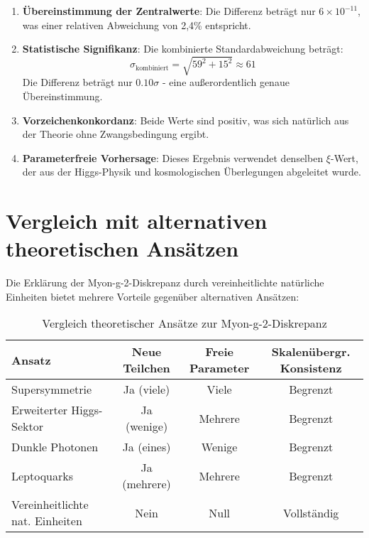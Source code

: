 \documentclass[12pt,a4paper]{article}
\newcommand{\xipar}{\xi}
\begin{document}
	\begin{enumerate}
		\item \textbf{Übereinstimmung der Zentralwerte}: Die Differenz beträgt nur $6 \times 10^{-11}$, was einer relativen Abweichung von 2,4\% entspricht.
		
		\item \textbf{Statistische Signifikanz}: Die kombinierte Standardabweichung beträgt:
		\begin{equation}
			\sigma_{\text{kombiniert}} = \sqrt{59^2 + 15^2} \approx 61
		\end{equation}
		Die Differenz beträgt nur $0.10\sigma$ - eine außerordentlich genaue Übereinstimmung.
		
		\item \textbf{Vorzeichenkonkordanz}: Beide Werte sind positiv, was sich natürlich aus der Theorie ohne Zwangsbedingung ergibt.
		
		\item \textbf{Parameterfreie Vorhersage}: Dieses Ergebnis verwendet denselben $\xipar$-Wert, der aus der Higgs-Physik und kosmologischen Überlegungen abgeleitet wurde.
	\end{enumerate}
	
	\section{Vergleich mit alternativen theoretischen Ansätzen}
	
	Die Erklärung der Myon-g-2-Diskrepanz durch vereinheitlichte natürliche Einheiten bietet mehrere Vorteile gegenüber alternativen Ansätzen:
	
	\begin{table}[htbp]
		\centering
		\begin{tabular}{|l|c|c|c|}
			\hline
			\textbf{Ansatz} & \textbf{Neue Teilchen} & \textbf{Freie Parameter} & \textbf{Skalenübergr. Konsistenz} \\
			\hline
			Supersymmetrie & Ja (viele) & Viele & Begrenzt \\
			Erweiterter Higgs-Sektor & Ja (wenige) & Mehrere & Begrenzt \\
			Dunkle Photonen & Ja (eines) & Wenige & Begrenzt \\
			Leptoquarks & Ja (mehrere) & Mehrere & Begrenzt \\
			Vereinheitlichte nat. Einheiten & Nein & Null & Vollständig \\
			\hline
		\end{tabular}
		\caption{Vergleich theoretischer Ansätze zur Myon-g-2-Diskrepanz}
	\end{table}
	
\end{document}
